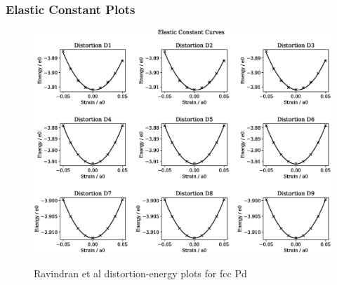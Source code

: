 \clearpage
\subsubsection{Elastic Constant Plots}

\begin{figure}[htb]
\centering
\includegraphics[width=.90\linewidth]{chapters/potentials_fe_pd_ru/fepd_potential/ec_rfkj/elastic_strains_bp_2.eps}  
\label{fig:fepd-pdfcc-distortions}
\caption{Ravindran et al\cite{dftrfkj} distortion-energy plots for \acrshort{fcc} Pd}
\end{figure}

